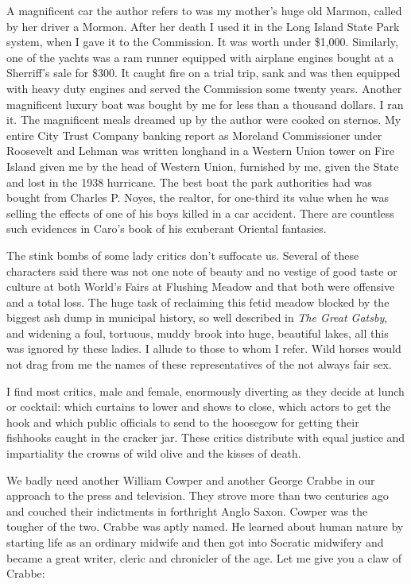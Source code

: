 \documentclass[11pt,letterpaper]{article}
\begin{document}
A magnificent car the author refers to was my mother's huge old Marmon, called by her driver a Mormon. After her death I used it in the Long Island State Park system, when I gave it to the Commission. It was worth under \$1,000. Similarly, one of the yachts was a ram runner equipped with airplane engines bought at a Sherriff's sale for \$300. It caught fire on a trial trip, sank and was then equipped with heavy duty engines and served the Commission some twenty years. Another magnificent luxury boat was bought by me for less than a thousand dollars. I ran it. The magnificent meals dreamed up by the author were cooked on sternos. My entire City Trust Company banking report as Moreland Commissioner under Roosevelt and Lehman was written longhand in a Western Union tower on Fire Island given me by the head of Western Union, furnished by me, given the State and lost in the 1938 hurricane. The best boat the park authorities had was bought from Charles P. Noyes, the realtor, for one-third its value when he was selling the effects of one of his boys killed in a car accident. There are countless such evidences in Caro's book of his exuberant Oriental fantasies.

The stink bombs of some lady critics don't suffocate us. Several of these characters said there was not one note of beauty and no vestige of good taste or culture at both World's Fairs at Flushing Meadow and that both were offensive and a total loss. The huge task of reclaiming this fetid meadow blocked by the biggest ash dump in municipal history, so well described in \textit{The Great Gatsby}, and widening a foul, tortuous, muddy brook into huge, beautiful lakes, all this was ignored by these ladies. I allude to those to whom I refer. Wild horses would not drag from me the names of these representatives of the not always fair sex.

I find most critics, male and female, enormously diverting as they decide at lunch or cocktail: which curtains to lower and shows to close, which actors to get the hook and which public officials to send to the hoosegow for getting their fishhooks caught in the cracker jar. These critics distribute with equal justice and impartiality the crowns of wild olive and the kisses of death.

We badly need another William Cowper and another George Crabbe in our approach to the press and television. They strove more than two centuries ago and couched their indictments in forthright Anglo Saxon. Cowper was the tougher of the two. Crabbe was aptly named. He learned about human nature by starting life as an ordinary midwife and then got into Socratic midwifery and became a great writer, cleric and chronicler of the age. Let me give you a claw of Crabbe:
\end{document}
